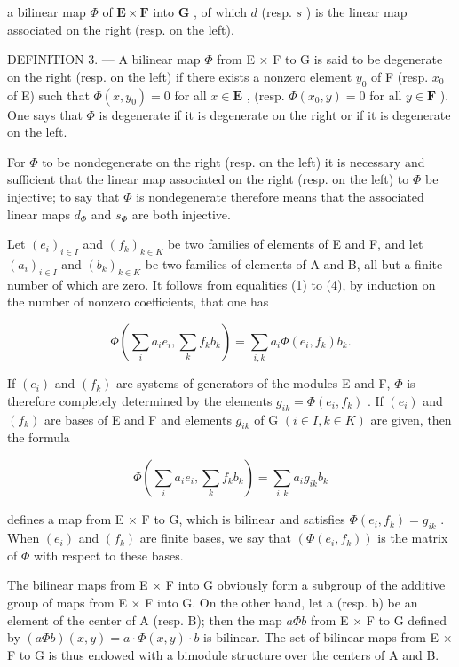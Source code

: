 a bilinear map \(\Phi\) of \(\mathbf{E} \times \mathbf{F}\) into \(\mathbf{G}\) , of which \(d\) (resp. \(s\) ) is the linear map associated on the right (resp. on the left).

DEFINITION 3. --- A bilinear map \(\Phi\) from E × F to G is said to be degenerate on the right (resp. on the left) if there exists a nonzero element \(y_0\) of F (resp. \(x_0\) of E) such that \(\Phi(x, y_0) = 0\) for all \(x \in \mathbf{E}\) , (resp. \(\Phi(x_0, y) = 0\) for all \(y \in \mathbf{F}\) ). One says that \(\Phi\) is degenerate if it is degenerate on the right or if it is degenerate on the left.

For \(\Phi\) to be nondegenerate on the right (resp. on the left) it is necessary and sufficient that the linear map associated on the right (resp. on the left) to \(\Phi\) be injective; to say that \(\Phi\) is nondegenerate therefore means that the associated linear maps \(d_{\Phi}\) and \(s_{\Phi}\) are both injective.

Let \((e_i)_{i\in I}\) and \((f_k)_{k\in K}\) be two families of elements of E and F, and let \((a_i)_{i\in I}\) and \((b_k)_{k\in K}\) be two families of elements of A and B, all but a finite number of which are zero. It follows from equalities (1) to (4), by induction on the number of nonzero coefficients, that one has

\[
\Phi (\sum_ {i} a _ {i} e _ {i}, \sum_ {k} f _ {k} b _ {k}) = \sum_ {i, k} a _ {i} \Phi (e _ {i}, f _ {k}) b _ {k}.\tag{6}
\]

If \((e_{i})\) and \((f_{k})\) are systems of generators of the modules E and F, \(\Phi\) is therefore completely determined by the elements \(g_{ik} = \Phi(e_{i}, f_{k})\) . If \((e_{i})\) and \((f_{k})\) are bases of E and F and elements \(g_{ik}\) of G \((i \in I, k \in K)\) are given, then the formula

\[
\Phi (\sum_ {i} a _ {i} e _ {i}, \sum_ {k} f _ {k} b _ {k}) = \sum_ {i, k} a _ {i} g _ {i k} b _ {k}\tag{6'}
\]

defines a map from E × F to G, which is bilinear and satisfies \(\Phi(e_{i}, f_{k}) = g_{ik}\) . When \((e_{i})\) and \((f_{k})\) are finite bases, we say that \((\Phi(e_{i}, f_{k}))\) is the matrix of \(\Phi\) with respect to these bases.

The bilinear maps from E × F into G obviously form a subgroup of the additive group of maps from E × F into G. On the other hand, let a (resp. b) be an element of the center of A (resp. B); then the map \(a\Phi b\) from E × F to G defined by \((a\Phi b)(x, y) = a \cdot \Phi(x, y) \cdot b\) is bilinear. The set of bilinear maps from E × F to G is thus endowed with a bimodule structure over the centers of A and B.

